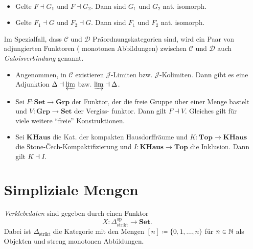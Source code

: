 \documentclass{cheat-sheet}
\newcommand{\SetC}{\mathbf{Set}} %
\newcommand{\Top}{\mathbf{Top}} %
\newcommand{\Grp}{\mathbf{Grp}} %
\newcommand{\KHaus}{\mathbf{KHaus}} %
\newcommand{\op}{\mathrm{op}} %
\newcommand{\Cat}{\mathcal{C}} %
\newcommand{\Dat}{\mathcal{D}} %
\newcommand{\Jat}{\mathcal{J}} %
\newcommand{\ladj}{\dashv} %
\begin{document}
\begin{lem}\mbox{}\\
  \begin{itemize}
    \item Gelte $F \ladj G_1$ und $F \ladj G_2$. Dann sind $G_1$ und $G_2$ nat. isomorph.
    \item Gelte $F_1 \ladj G$ und $F_2 \ladj G$. Dann sind $F_1$ und $F_2$ nat. isomorph.
  \end{itemize}
\end{lem}

\begin{defn}
  Im Spezialfall, dass $\Cat$ und $\Dat$ Präordnungskategorien sind, wird ein Paar von adjungierten Funktoren (\dh{} monotonen Abbildungen) zwischen $\Cat$ und $\Dat$ auch \emph{Galoisverbindung} genannt.
\end{defn}

\begin{bspe}
  \begin{itemize}
    \item Angenommen, in $\Cat$ existieren $\Jat$-Limiten bzw. $\Jat$-Kolimiten. Dann gibt es eine Adjunktion
    $\Delta \ladj \varprojlim$
    bzw.
    $\varinjlim \ladj \Delta$.
    \item Sei $F : \SetC \to \Grp$ der Funktor, der die freie Gruppe über einer Menge bastelt und $V : \Grp \to \SetC$ der Vergiss- funktor. Dann gilt $F \ladj V$. Gleiches gilt für viele weitere "`freie"' Konstruktionen.
    \item Sei $\KHaus$ die Kat. der kompakten Hausdorffräume und $K : \Top \to \KHaus$ die Stone-Čech-Kompaktifizierung und $I : \KHaus \to \Top$ die Inklusion. Dann gilt $K \ladj I$.
  \end{itemize}
\end{bspe}




\section{Simpliziale Mengen}


\begin{defn}
  \emph{Verklebedaten} sind gegeben durch einen Funktor
  \[ X : \Delta_{\text{strikt}}^\op \to \SetC. \]
  Dabei ist $\Delta_{\text{strikt}}$ die Kategorie mit den Mengen
  $[n] \coloneqq \{ 0, 1, \ldots, n \}$ für $n \in \mathbb{N}$ als Objekten und streng monotonen Abbildungen.
\end{defn}
\end{document}
